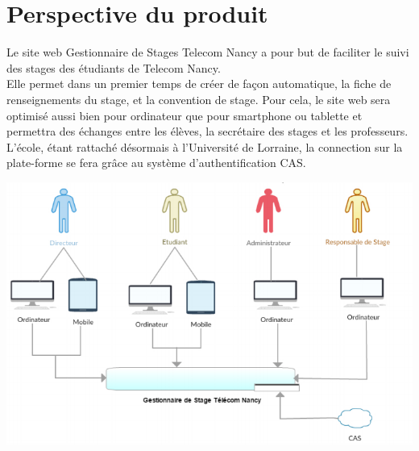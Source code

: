 \documentclass{scrreprt}
\begin{document}
\section{Perspective du produit}

\hspace{1cm}Le site web Gestionnaire de Stages Telecom Nancy a pour but de faciliter le suivi des stages des étudiants de Telecom Nancy.\\

\hspace{0.6cm}Elle permet dans un premier temps de créer de façon automatique, la fiche de renseignements du stage, et la convention de stage. Pour cela, le site web sera optimisé aussi bien pour ordinateur que pour smartphone ou tablette et permettra des échanges entre les élèves, la secrétaire des stages et les professeurs. L'école, étant rattaché désormais à l'Université de Lorraine, la connection sur la plate-forme se fera grâce au système d'authentification CAS.

\begin{center}
\centerline{\includegraphics[scale=0.65]{image/perspectivedeproduit.png}}
\end{center}
\end{document}
